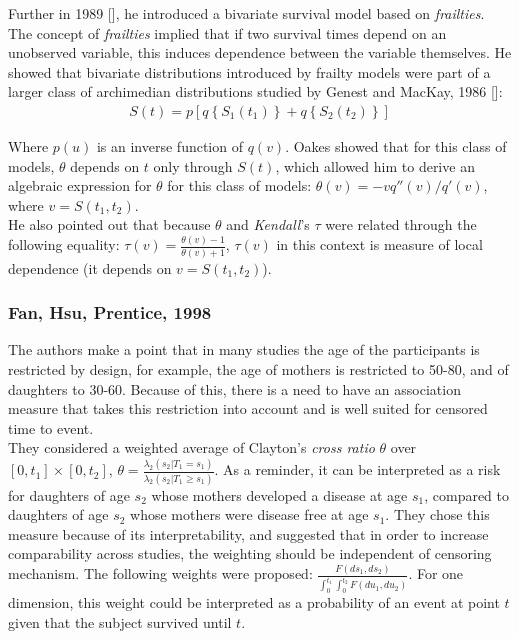 \documentclass[]{article}
\begin{document}
 Further in 1989 [\cite{oakes1989bivariate}], he introduced a bivariate survival model based on \emph{frailties}. The concept of \emph{frailties} implied that if two survival times depend on an unobserved variable, this induces dependence between the variable themselves. He showed that bivariate distributions introduced by frailty models were part of a larger class of archimedian distributions studied by Genest and MacKay, 1986 [\cite{genest1986copules}]:
$$
\begin{aligned}
	S(t) = p\left[ q\left\{ S_1(t_1) \right\}  + q\left\{ S_2(t_2) \right\}  \right]
\end{aligned}
$$

Where $p(u)$ is an inverse function of $q(v)$. Oakes showed that for this class of models, $\theta$ depends on $t$ only through $S(t)$, which allowed him to derive an algebraic expression for $\theta$ for this class of models:  $\theta(v) = -vq''(v)/q'(v)$, where $v=S(t_1, t_2)$.\\
He also pointed out that because $\theta$ and \emph{Kendall}'s $\tau$ were related through the following equality: $\tau(v) = \frac{\theta(v)-1}{\theta(v)+1}$, $\tau(v)$ in this context is measure of local dependence (it depends on $v=S(t_1, t_2)$).

\subsubsection{Fan, Hsu, Prentice, 1998 \cite{fan2000dependence}}
The authors make a point that in many studies the age of the participants is restricted by design, for example, the age of mothers is restricted to 50-80, and of daughters to 30-60. Because of this, there is a need to have an association measure that takes this restriction into account and is well suited for censored time to event. \\

They considered a weighted average of Clayton's \textit{cross ratio} $\theta$ over $[0,t_1] \times [0, t_2]$, $\theta = \frac{ \lambda_2(s_2|T_1=s_1)}{\lambda_2(s_2|T_1 \geq s_1)}$. As a reminder, it can be interpreted as a risk for daughters of age $s_2$ whose mothers developed a disease at age $s_1$, compared to daughters of age $s_2$ whose mothers were disease free at age $s_1$. They chose this measure because of its interpretability, and suggested that in order to increase comparability across studies, the weighting should be independent of censoring mechanism. The following weights were proposed: $\frac{F(ds_1,ds_2)}{\int_0^{t_1}\int_0^{t_2} F(du_1, du_2)}$. For one dimension, this weight could be interpreted as a probability of an event at point $t$ given that the subject survived until $t$.\\
\end{document}
